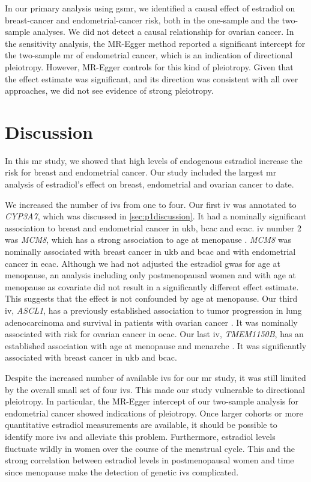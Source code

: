\documentclass[draft]{scrbook}
\begin{document}
In our primary analysis using \textsf{gsmr}, we identified a causal effect of estradiol on breast-cancer and endometrial-cancer risk, both in the one-sample and the two-sample analyses.
We did not detect a causal relationship for ovarian cancer.
In the sensitivity analysis, the MR-Egger method reported a significant intercept for the two-sample \gls{mr} of endometrial cancer, which is an indication of directional pleiotropy.
However, MR-Egger controls for this kind of pleiotropy.
Given that the effect estimate was significant, and its direction was consistent with all over approaches, we did not see evidence of strong pleiotropy.

\section{Discussion}
In this \gls{mr} study, we showed that high levels of endogenous estradiol increase the risk for breast and endometrial cancer.
Our study included the largest \gls{mr} analysis of estradiol's effect on breast, endometrial and ovarian cancer to date.

We increased the number of \glspl{iv} from one to four.
Our first \gls{iv} was annotated to \textit{CYP3A7}, which was discussed in \cref{sec:p1discussion}.
It had a nominally significant association to breast and endometrial cancer in \gls{ukb}, \gls{bcac} and \gls{ecac}.
\Gls{iv} number 2 was \textit{MCM8}, which has a strong association to age at menopause \cite{Chen2014}.
\textit{MCM8} was nominally associated with breast cancer in \gls{ukb} and \gls{bcac} and with endometrial cancer in \gls{ecac}.
Although we had not adjusted the estradiol \gls{gwas} for age at menopause, an analysis including only postmenopausal women and with age at menopause as covariate did not result in a significantly different effect estimate.
This suggests that the effect is not confounded by age at menopause.
Our third \gls{iv}, \textit{ASCL1}, has a previously established association to tumor progression in lung adenocarcinoma  and survival in patients with ovarian cancer \cite{Miyashita2020,Moore2017}.
It was nominally associated with risk for ovarian cancer in \gls{ocac}.
Our last \gls{iv}, \textit{TMEM1150B}, has an established association with age at menopause and menarche \cite{Stolk2012,Pickrell2016}.
It was significantly associated with breast cancer in \gls{ukb} and \gls{bcac}.

Despite the increased number of available \glspl{iv} for our \gls{mr} study, it was still limited by the overall small set of four \glspl{iv}.
This made our study vulnerable to directional pleiotropy.
In particular, the MR-Egger intercept of our two-sample analysis for endometrial cancer showed indications of pleiotropy.
Once larger cohorts or more quantitative estradiol measurements are available, it should be possible to identify more \glspl{iv} and alleviate this problem.
Furthermore, estradiol levels fluctuate wildly in women over the course of the menstrual cycle.
This and the strong correlation between estradiol levels in postmenopausal women and time since menopause make the detection of genetic \glspl{iv} complicated.
\end{document}
